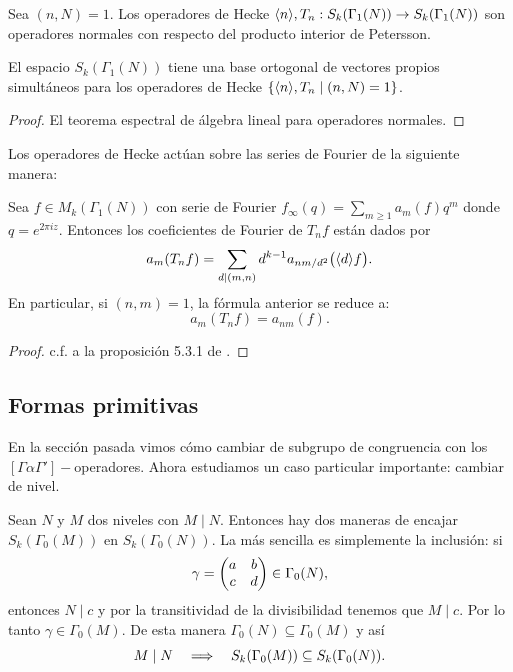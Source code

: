 \documentclass[../../tesis_maestria]{subfiles}
\begin{document}
\begin{prop}
  Sea $(n,N)=1$. Los operadores de Hecke $\langle n \rangle,T_n:S_k(\Gamma_1(N))\rightarrow S_k(\Gamma_1(N))$ son
  operadores normales con respecto del producto interior de Petersson.
\end{prop}
\begin{cor}\label{cor:basesimultanea}
  El espacio $S_k(\Gamma_1(N))$ tiene una base ortogonal de vectores propios simult\'aneos para
  los operadores de Hecke $\{\langle n \rangle,T_n\mid (n,N)=1\}$.
\end{cor}
\begin{proof}
  El teorema espectral de \'algebra lineal para operadores normales.
\end{proof}

Los operadores de Hecke act\'uan sobre las series de Fourier de la siguiente manera:

\begin{prop}\label{prop:coefTnf}
  Sea $f\in M_k(\Gamma_1(N))$ con serie de Fourier $f_{\infty}(q)=\sum_{m\geq1}a_m(f)q^m$ donde
  $q=e^{2\pi i z}$. Entonces los coeficientes de Fourier de $T_nf$ est\'an dados por
  \[
    a_m(T_nf)=\sum_{d\mid(m,n)}d^{k-1}a_{nm/d^2}\big(\langle d \rangle f\big).
  \]
  En particular, si $(n,m)=1$, la f\'ormula anterior se reduce a:
  \[
    a_m(T_nf)=a_{nm}(f).
  \]
\end{prop}
\begin{proof}
  c.f. a la proposici\'on 5.3.1 de \cite{DiamondShurmanAFCIMF}.
\end{proof}


\subsection{Formas primitivas}\label{sec:formas_primitivas}%

En la secci\'on pasada vimos c\'omo cambiar de subgrupo de congruencia con los
$[\Gamma\alpha\Gamma']-$operadores. Ahora estudiamos un caso particular importante: cambiar de
nivel.

Sean $N$ y $M$ dos niveles con $M\mid N$. Entonces hay dos maneras de encajar $S_k(\Gamma_0(M))$
en $S_k(\Gamma_0(N))$. La m\'as sencilla es simplemente la inclusi\'on: si
\[
  \gamma=\begin{pmatrix}a & b\\ c & d\end{pmatrix}\in\Gamma_0(N),
\]
entonces $N\mid c$ y por la transitividad de la divisibilidad tenemos que  $M\mid c$. Por lo tanto
$\gamma\in\Gamma_0(M)$. De esta manera $\Gamma_0(N)\subseteq\Gamma_0(M)$ y as\'i
\[
  M\mid N\quad\Longrightarrow\quad S_k(\Gamma_0(M))\subseteq S_k(\Gamma_0(N)).
\]
\end{document}
